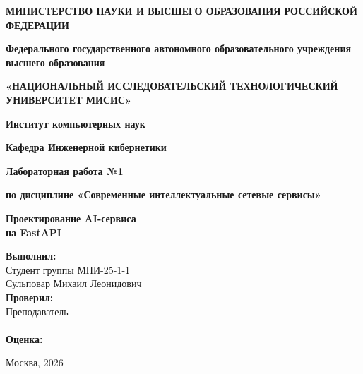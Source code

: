 \documentclass[12pt,a4paper]{article}
\newcommand{\StudentName}{Сульповар Михаил Леонидович}
\newcommand{\StudentGroup}{МПИ-25-1-1}
\newcommand{\TeacherName}{\underline{\hspace{5cm}}}
\begin{document}
\begin{titlepage}
    \begin{center}
        \textbf{МИНИСТЕРСТВО НАУКИ И ВЫСШЕГО ОБРАЗОВАНИЯ РОССИЙСКОЙ ФЕДЕРАЦИИ}
        \vspace{0.5cm}
        
        \textbf{Федерального государственного автономного образовательного учреждения \\ высшего образования}
        \vspace{0.3cm}
        
        \textbf{«НАЦИОНАЛЬНЫЙ ИССЛЕДОВАТЕЛЬСКИЙ ТЕХНОЛОГИЧЕСКИЙ УНИВЕРСИТЕТ МИСИС»}
        \vspace{2cm}

        
        \textbf{Институт компьютерных наук}
        \vspace{0.3cm}

        \textbf{Кафедра Инженерной кибернетики}
        \vspace{1cm}
        
        \textbf{Лабораторная работа №1}
        \vspace{0.3cm}
        
        \textbf{по дисциплине «Современные интеллектуальные сетевые сервисы»}
        \vspace{1.5cm}
        
        \huge{\textbf{Проектирование AI-сервиса \\ на FastAPI}}
        \vspace{2cm}
    \end{center}
    
    \begin{flushright}
        \textbf{Выполнил:} \\
        Студент группы \StudentGroup \\
        \StudentName \\
        \vspace{0.5cm}
        \textbf{Проверил:} \\
        Преподаватель \\
        \TeacherName \\
        \vspace{2cm}
        \textbf{Оценка:} \hrulefill
    \end{flushright}
    
    \begin{center}
        \vfill
        Москва, 2026
    \end{center}
\end{titlepage}
\end{document}
